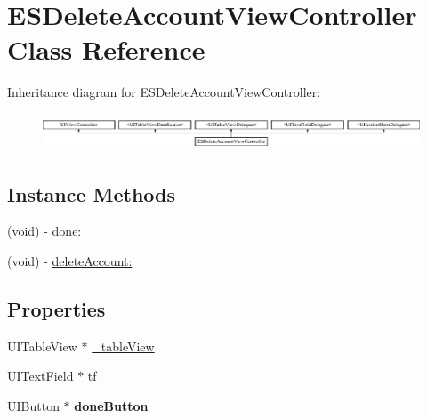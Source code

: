 \hypertarget{interface_e_s_delete_account_view_controller}{}\section{E\+S\+Delete\+Account\+View\+Controller Class Reference}
\label{interface_e_s_delete_account_view_controller}
Inheritance diagram for E\+S\+Delete\+Account\+View\+Controller\+:\begin{figure}[H]
\begin{center}
\leavevmode
\includegraphics[height=1.103448cm]{interface_e_s_delete_account_view_controller}
\end{center}
\end{figure}
\subsection*{Instance Methods}
\begin{DoxyCompactItemize}
\item 
(void) -\/ \hyperlink{interface_e_s_delete_account_view_controller_a90816e48d191b607fa3daf504cfc7e6b}{done\+:}
\item 
(void) -\/ \hyperlink{interface_e_s_delete_account_view_controller_a95e7e181b62f7f6013aad09a431d7abd}{delete\+Account\+:}
\end{DoxyCompactItemize}
\subsection*{Properties}
\begin{DoxyCompactItemize}
\item 
U\+I\+Table\+View $\ast$ \hyperlink{interface_e_s_delete_account_view_controller_a79029845823c0fbc5b5eb8a98cf9b72b}{\+\_\+table\+View}
\item 
U\+I\+Text\+Field $\ast$ \hyperlink{interface_e_s_delete_account_view_controller_a087a1d468f6719f900cf77c5e4e58284}{tf}
\item 
\hypertarget{interface_e_s_delete_account_view_controller_af7a69376f911074ba49b0c0e42470036}{}U\+I\+Button $\ast$ {\bfseries done\+Button}\label{interface_e_s_delete_account_view_controller_af7a69376f911074ba49b0c0e42470036}

\end{DoxyCompactItemize}


